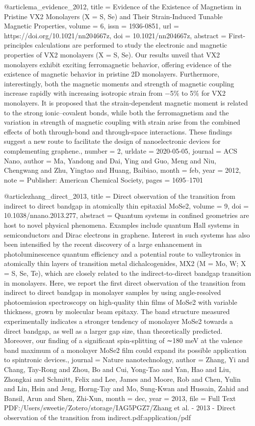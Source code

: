 {@article{ma_evidence_2012,
	title = {Evidence of the {Existence} of {Magnetism} in {Pristine} {VX2} {Monolayers} ({X} = {S}, {Se}) and {Their} {Strain}-{Induced} {Tunable} {Magnetic} {Properties}},
	volume = {6},
	issn = {1936-0851},
	url = {https://doi.org/10.1021/nn204667z},
	doi = {10.1021/nn204667z},
	abstract = {First-principles calculations are performed to study the electronic and magnetic properties of VX2 monolayers (X = S, Se). Our results unveil that VX2 monolayers exhibit exciting ferromagnetic behavior, offering evidence of the existence of magnetic behavior in pristine 2D monolayers. Furthermore, interestingly, both the magnetic moments and strength of magnetic coupling increase rapidly with increasing isotropic strain from −5\% to 5\% for VX2 monolayers. It is proposed that the strain-dependent magnetic moment is related to the strong ionic–covalent bonds, while both the ferromagnetism and the variation in strength of magnetic coupling with strain arise from the combined effects of both through-bond and through-space interactions. These findings suggest a new route to facilitate the design of nanoelectronic devices for complementing graphene.},
	number = {2},
	urldate = {2020-05-05},
	journal = {ACS Nano},
	author = {Ma, Yandong and Dai, Ying and Guo, Meng and Niu, Chengwang and Zhu, Yingtao and Huang, Baibiao},
	month = feb,
	year = {2012},
	note = {Publisher: American Chemical Society},
	pages = {1695--1701}
}

@article{zhang_direct_2013,
	title = {Direct observation of the transition from indirect to direct bandgap in atomically thin epitaxial {MoSe2}},
	volume = {9},
	doi = {10.1038/nnano.2013.277},
	abstract = {Quantum systems in confined geometries are host to novel physical phenomena. Examples include quantum Hall systems in semiconductors and Dirac electrons in graphene. Interest in such systems has also been intensified by the recent discovery of a large enhancement in photoluminescence quantum efficiency and a potential route to valleytronics in atomically thin layers of transition metal dichalcogenides, MX2 (M = Mo, W; X = S, Se, Te), which are closely related to the indirect-to-direct bandgap transition in monolayers. Here, we report the first direct observation of the transition from indirect to direct bandgap in monolayer samples by using angle-resolved photoemission spectroscopy on high-quality thin films of MoSe2 with variable thickness, grown by molecular beam epitaxy. The band structure measured experimentally indicates a stronger tendency of monolayer MoSe2 towards a direct bandgap, as well as a larger gap size, than theoretically predicted. Moreover, our finding of a significant spin-splitting of ∼180 meV at the valence band maximum of a monolayer MoSe2 film could expand its possible application to spintronic devices.},
	journal = {Nature nanotechnology},
	author = {Zhang, Yi and Chang, Tay-Rong and Zhou, Bo and Cui, Yong-Tao and Yan, Hao and Liu, Zhongkai and Schmitt, Felix and Lee, James and Moore, Rob and Chen, Yulin and Lin, Hsin and Jeng, Horng-Tay and Mo, Sung-Kwan and Hussain, Zahid and Bansil, Arun and Shen, Zhi-Xun},
	month = dec,
	year = {2013},
	file = {Full Text PDF:/Users/sweetie/Zotero/storage/IAG5PGZ7/Zhang et al. - 2013 - Direct observation of the transition from indirect.pdf:application/pdf}
}

}

